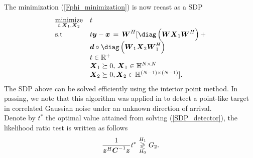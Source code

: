 \indent The minimization (\ref{Fphi_minimization}) is now recast as a SDP
\begin{equation}\label{SDP_detector}
\begin{array}{ll}
                        \underset{t,\boldsymbol{X}_1,\boldsymbol{X}_2}{\text{minimize}} & t\\
 \text{s.t} & t\boldsymbol{y}-\boldsymbol{x} \thinspace=\thinspace
 \boldsymbol{W}^H [ \diag \left ( \boldsymbol{W} \boldsymbol{X}_1 \boldsymbol{W}^H \right ) + \\
            & \boldsymbol{d}\circ \diag \left ( \boldsymbol{W}_1 \boldsymbol{X}_2 \boldsymbol{W}_1^H \right ) \\
                            & t \in \mathbb{R}^{+} \\
                            & \boldsymbol{X}_1 \succeq 0,\thinspace \boldsymbol{X}_1 \in \mathbb{H}^{N \times N} \\
                              & \boldsymbol{X}_2 \succeq 0, \boldsymbol{X}_2 \in \mathbb{H}^{(N-1)\times (N-1)} ].
        \end{array}
\end{equation}
The SDP above can be solved efficiently using the interior point method.
In passing, we note that
 this algorithm was applied in \cite{DeMaio10} to  detect a point-like target
in correlated Gaussian noise under an unknown direction of arrival.\\
\indent Denote by $t^{\ast}$ the optimal value %
attained from solving (\ref{SDP_detector}),
the likelihood ratio  test is written as follows
\begin{equation}\label{final_test}
\frac{1}
     {  \boldsymbol{z}^H \boldsymbol{C}^{-1} \boldsymbol{z} } t^{\ast}
   \thinspace\mathop{\gtrless}_{H_0}^{H_1}\thinspace G_2.
\end{equation}
\indent
